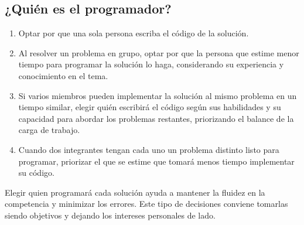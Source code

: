 \subsection{¿Quién es el programador?}
\begin{enumerate}[resume=icpc]
    \item Optar por que una sola persona escriba el código de la solución.
    \item Al resolver un problema en grupo, optar por que la persona que estime menor tiempo para programar la solución lo haga, considerando su experiencia y conocimiento en el tema.
    \item Si varios miembros pueden implementar la solución al mismo problema en un tiempo similar, elegir quién escribirá el código según sus habilidades y su capacidad para abordar los problemas restantes, priorizando el balance de la carga de trabajo.
    \item Cuando dos integrantes tengan cada uno un problema distinto listo para programar, priorizar el que se estime que tomará menos tiempo implementar su código.
\end{enumerate}
Elegir quien programará cada solución ayuda a mantener la fluidez en la competencia y minimizar los errores. Este tipo de decisiones conviene tomarlas siendo objetivos y dejando los intereses personales de lado.
\pagebreak
